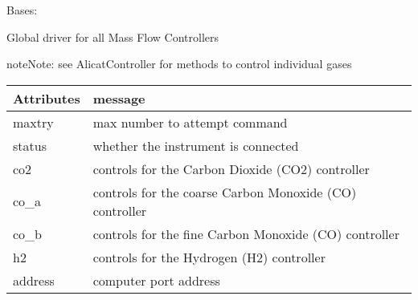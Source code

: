 \documentclass[letterpaper,10pt,english]{sphinxmanual}
\begin{document}

\begin{fulllineitems}
\label{\detokenize{source/laboratory.drivers:laboratory.drivers.mfc.MFC}}
Bases: {\hyperref[\detokenize{source/laboratory.drivers:laboratory.drivers.mfc.AlicatController}]{}}

Global driver for all Mass Flow Controllers

\begin{sphinxadmonition}{note}{Note:}
see AlicatController for methods to control individual gases
\end{sphinxadmonition}


\begin{savenotes}\sphinxattablestart
\centering
\begin{tabulary}{\linewidth}[t]{|T|T|}
\hline
\sphinxstyletheadfamily 
Attributes
&\sphinxstyletheadfamily 
message
\\
\hline
maxtry
&
max number to attempt command
\\
\hline
status
&
whether the instrument is connected
\\
\hline
co2
&
controls for the Carbon Dioxide (CO2) controller
\\
\hline
co\_a
&
controls for the coarse Carbon Monoxide (CO) controller
\\
\hline
co\_b
&
controls for the fine Carbon Monoxide (CO) controller
\\
\hline
h2
&
controls for the Hydrogen (H2) controller
\\
\hline
address
&
computer port address
\\
\hline
\end{tabulary}
\par
\sphinxattableend\end{savenotes}



\end{fulllineitems}
\end{document}
